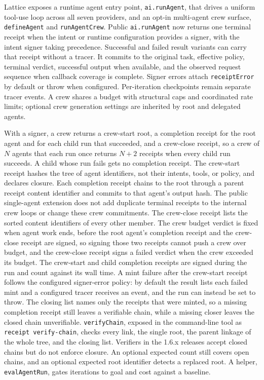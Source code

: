\documentclass[conference]{IEEEtran}
\newcommand{\code}[1]{\texttt{\small #1}}
\begin{document}
Lattice exposes a runtime agent entry point, \code{ai.runAgent}, that drives a uniform
tool-use loop across all seven providers, and an opt-in multi-agent crew surface,
\code{defineAgent} and \code{runAgentCrew}. Public \code{ai.runAgent} now returns one
terminal receipt when the intent or runtime configuration provides a signer, with
the intent signer taking precedence. Successful and failed result variants can carry
that receipt without a tracer. It commits to the original task, effective policy,
terminal verdict, successful output when available, and the observed request sequence
when callback coverage is complete. Signer errors attach \code{receiptError} by
default or throw when configured. Per-iteration checkpoints remain separate tracer
events. A crew shares a budget with structural caps and coordinated rate limits;
optional crew generation settings are inherited by root and delegated agents.

With a signer, a crew returns a crew-start root, a completion receipt for the root
agent and for each child run that succeeded, and a crew-close receipt, so a crew of
$N$ agents that each run once returns $N+2$ receipts when every child run succeeds. A
child whose run fails gets no completion receipt. The crew-start receipt hashes
the tree of agent identifiers, not their intents, tools, or policy, and declares
closure. Each completion receipt chains to the root through a parent receipt content
identifier and commits to that agent's output hash. The public single-agent extension
does not add duplicate terminal receipts to the internal crew loops or change these
crew commitments. The crew-close receipt lists the
sorted content identifiers of every other member. The crew budget verdict is fixed when
agent work ends, before the root agent's completion receipt and the crew-close receipt
are signed, so signing those two receipts cannot push a crew over budget, and the
crew-close receipt signs a failed verdict when the crew exceeded its budget. The
crew-start and child completion receipts are signed during the run and count against
its wall time. A mint failure after the crew-start receipt follows the configured
signer-error policy: by default the result lists each failed mint and a configured
tracer receives an event, and the run can instead be set to throw. The closing list names only the receipts that were minted, so
a missing completion receipt still leaves a verifiable chain, while a missing closer
leaves the closed chain unverifiable. \code{verifyChain}, exposed in the command-line
tool as \code{receipt verify-chain}, checks every link, the single root, the parent
linkage of the whole tree, and the closing list. Verifiers in the 1.6.x releases accept
closed chains but do not enforce closure. An optional expected count still covers open
chains, and an optional expected root identifier detects a replaced root. A helper,
\code{evalAgentRun}, gates iterations to goal and cost against a baseline.
\end{document}
